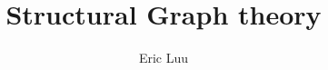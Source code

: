 \documentclass[]{article}
\title{Structural Graph theory}
\author{Eric Luu}
\begin{document}
\maketitle

\section{}
\end{document}
